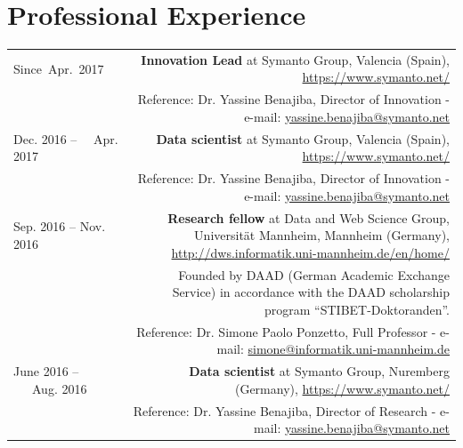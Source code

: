 \documentclass[10pt]{article}
\begin{document}
\section*{Professional Experience}
\begin{tabular}{L!{\VRule}R}

Since~Apr.~2017 &{\textbf{Innovation Lead} at Symanto Group, Valencia (Spain), \url{https://www.symanto.net/}}\\
&\scriptsize{Reference: Dr. Yassine Benajiba, Director of Innovation - e-mail: \href{mailto:yassine.benajiba@symanto.net}{yassine.benajiba@symanto.net}}\\

Dec. 2016 -- ~~Apr. 2017 ~~&{\textbf{Data scientist} at Symanto Group, Valencia (Spain), \url{https://www.symanto.net/}}\\
&\scriptsize{Reference: Dr. Yassine Benajiba, Director of Innovation - e-mail: \href{mailto:yassine.benajiba@symanto.net}{yassine.benajiba@symanto.net}}\\


 Sep. 2016 -- Nov. 2016 ~~&{\textbf{Research fellow} at Data and Web Science Group, Universit{\"a}t Mannheim, Mannheim (Germany), \url{http://dws.informatik.uni-mannheim.de/en/home/}}\\
 &\scriptsize{Founded by DAAD (German Academic Exchange Service) in accordance with the DAAD scholarship program ``STIBET-Doktoranden''.}\\
 &\scriptsize{Reference: Dr. Simone Paolo Ponzetto, Full Professor - e-mail: \href{mailto:simone@informatik.uni-mannheim.de}{simone@informatik.uni-mannheim.de}}\\

June 2016 -- ~~~Aug. 2016 ~~&{\textbf{Data scientist} at Symanto Group, Nuremberg (Germany), \url{https://www.symanto.net/}}\\
&\scriptsize{Reference: Dr. Yassine Benajiba, Director of Research - e-mail: \href{mailto:yassine.benajiba@symanto.net}{yassine.benajiba@symanto.net}}\\


\end{tabular}
\end{document}
